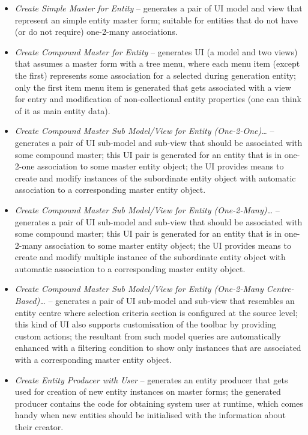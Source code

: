 \begin{description}
    \begin{itemize}
     \item \emph{Create Simple Master for Entity} -- generates a pair of UI model and view that represent an simple entity master form; suitable for entities that do not have (or do not require) one-2-many associations.
     \item \emph{Create Compound Master for Entity} -- generates UI (a model and two views) that assumes a master form with a tree menu, where each menu item (except the first) represents some association for a selected during generation entity; only the first item menu item is generated that gets associated with a view for entry and modification of non-collectional entity properties (one can think of it as main entity data).
     \item \emph{Create Compound Master Sub Model/View for Entity (One-2-One)\ldots} -- generates a pair of UI sub-model and sub-view that should be associated with some compound master; this UI pair is generated for an entity that is in one-2-one association to some master entity object; the UI provides means to create and modify instances of the subordinate entity object with automatic association to a corresponding master entity object.
     \item \emph{Create Compound Master Sub Model/View for Entity (One-2-Many)\ldots} -- generates a pair of UI sub-model and sub-view that should be associated with some compound master; this UI pair is generated for an entity that is in one-2-many association to some master entity object; the UI provides means to create and modify multiple instance of the subordinate entity object with automatic association to a corresponding master entity object.
     \item \emph{Create Compound Master Sub Model/View for Entity (One-2-Many Centre-Based)\ldots} -- generates a pair of UI sub-model and sub-view that resembles an entity centre where selection criteria section is configured at the source level; this kind of UI also supports customisation of the toolbar by providing custom actions; the resultant from such model queries are automatically enhanced with a filtering condition to show only instances that are associated with a corresponding master entity object.
     \item \emph{Create Entity Producer with User} -- generates an entity producer that gets used for creation of new entity instances on master forms; the generated producer contains the code for obtaining system user at runtime, which comes handy when new entities should be initialised with the information about their creator.
    \end{itemize}


\end{description}
